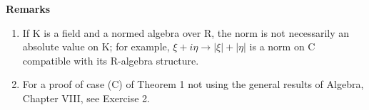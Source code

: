 \textbf{Remarks}\par

\begin{enumerate}
\def\labelenumi{(\arabic{enumi})}
\setcounter{enumi}{1}
\item
  If K is a field and a normed algebra over R, the norm is not necessarily an absolute value on K; for example, \(\xi + i\eta \to |\xi| + |\eta|\) is a norm on C compatible with its R-algebra structure.
\item
  For a proof of case (C) of Theorem 1 not using the general results of Algebra, Chapter VIII, see Exercise 2.
\end{enumerate}

